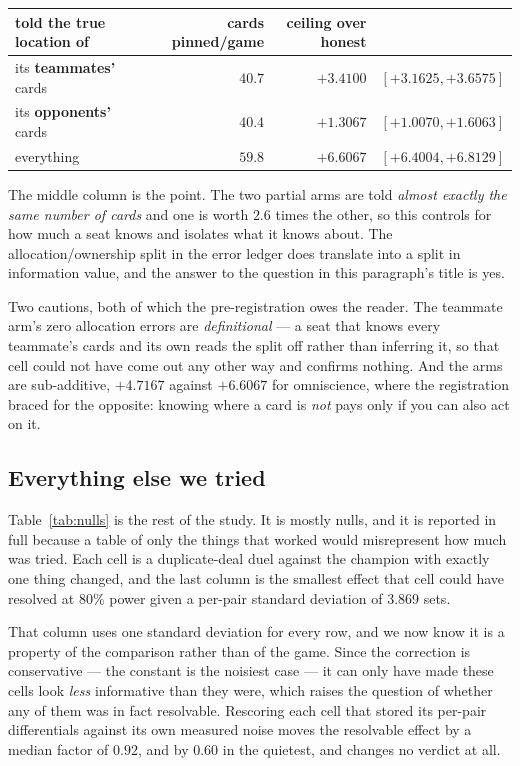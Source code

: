 \documentclass[11pt,a4paper]{article}
\begin{document}
\begin{center}
\small
\begin{tabular}{lrrr}
\toprule
told the true location of & cards pinned/game & ceiling over honest & \\
\midrule
its \textbf{teammates'} cards & $40.7$ & $+3.4100$ & $[+3.1625, +3.6575]$ \\
its \textbf{opponents'} cards & $40.4$ & $+1.3067$ & $[+1.0070, +1.6063]$ \\
everything & $59.8$ & $+6.6067$ & $[+6.4004, +6.8129]$ \\
\bottomrule
\end{tabular}
\end{center}

The middle column is the point. The two partial arms are told \emph{almost exactly
the same number of cards} and one is worth $2.6$ times the other, so this
controls for how much a seat knows and isolates what it knows about. The
allocation/ownership split in the error ledger does translate into a split in
information value, and the answer to the question in this paragraph's title is
yes.

Two cautions, both of which the pre-registration owes the reader. The teammate
arm's zero allocation errors are \emph{definitional} --- a seat that knows every
teammate's cards and its own reads the split off rather than inferring it, so
that cell could not have come out any other way and confirms nothing. And the
arms are sub-additive, $+4.7167$ against $+6.6067$ for omniscience, where the
registration braced for the opposite: knowing where a card is \emph{not} pays
only if you can also act on it.

\subsection{Everything else we tried}
\label{sec:res-null}

Table~\ref{tab:nulls} is the rest of the study. It is mostly nulls, and it is
reported in full because a table of only the things that worked would
misrepresent how much was tried. Each cell is a duplicate-deal duel against the
champion with exactly one thing changed, and the last column is the smallest
effect that cell could have resolved at 80\% power given a per-pair standard
deviation of 3.869 sets.

That column uses one standard deviation for every row, and we now know it is a
property of the comparison rather than of the game. Since the correction is
conservative --- the constant is the noisiest case --- it can only have made
these cells look \emph{less} informative than they were, which raises the
question of whether any of them was in fact resolvable. Rescoring each cell that
stored its per-pair differentials against its own measured noise moves the
resolvable effect by a median factor of $0.92$, and by $0.60$ in the quietest,
and changes no verdict at all.
\end{document}
